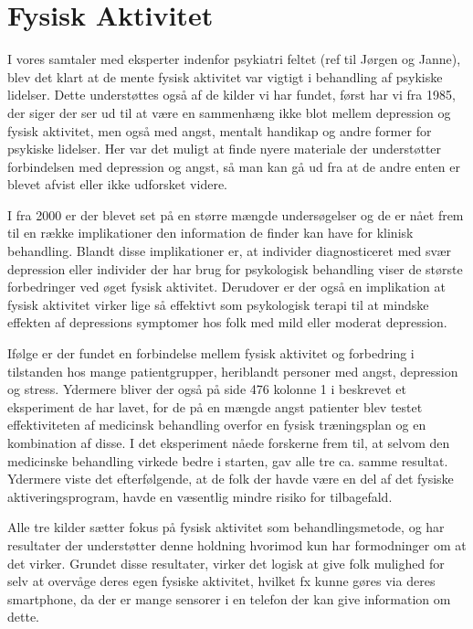 \section{Fysisk Aktivitet}
I vores samtaler med eksperter indenfor psykiatri feltet (ref til Jørgen og Janne), blev det klart at de mente fysisk aktivitet var vigtigt i behandling af psykiske lidelser.
Dette understøttes også af de kilder vi har fundet, først har vi \citet{misc:healthReports} fra 1985, der siger der ser ud til at være en sammenhæng ikke blot mellem depression og fysisk aktivitet, men også med angst, mentalt handikap og andre former for psykiske lidelser.
Her var det muligt at finde nyere materiale der understøtter forbindelsen med depression og angst, så man kan gå ud fra at de andre enten er blevet afvist eller ikke udforsket videre.

I \citet{art:physMental} fra 2000 er der blevet set på en større mængde undersøgelser og de er nået frem til en række implikationer den information de finder kan have for klinisk behandling.
Blandt disse implikationer er, at individer diagnosticeret med svær depression eller individer der har brug for psykologisk behandling viser de største forbedringer ved øget fysisk aktivitet.
Derudover er der også en implikation at fysisk aktivitet virker lige så effektivt som psykologisk terapi til at mindske effekten af depressions symptomer hos folk med mild eller moderat depression.

Ifølge \citet{book:sportPsyc} er der fundet en forbindelse mellem fysisk aktivitet og forbedring i tilstanden hos mange patientgrupper, heriblandt personer med angst, depression og stress.
Ydermere bliver der også på side 476 kolonne 1 i \citet{book:sportPsyc} beskrevet et eksperiment de har lavet, for de på en mængde angst patienter blev testet effektiviteten af medicinsk behandling overfor en fysisk træningsplan og en kombination af disse.
I det eksperiment nåede forskerne frem til, at selvom den medicinske behandling virkede bedre i starten, gav alle tre ca. samme resultat.
Ydermere viste det efterfølgende, at de folk der havde være en del af det fysiske aktiveringsprogram, havde en væsentlig mindre risiko for tilbagefald.

Alle tre kilder sætter fokus på fysisk aktivitet som behandlingsmetode, \citet{art:physMental} og \citet{book:sportPsyc} har resultater der understøtter denne holdning hvorimod \citet{misc:healthReports} kun har formodninger om at det virker.
Grundet disse resultater, virker det logisk at give folk mulighed for selv at overvåge deres egen fysiske aktivitet, hvilket fx kunne gøres via deres smartphone, da der er mange sensorer i en telefon der kan give information om dette.

